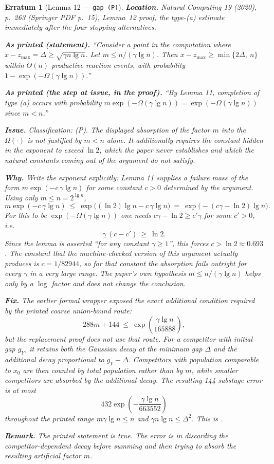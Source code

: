 \documentclass[11pt]{article}
\theoremstyle{erratumstyle}
\newtheorem{erratum}{Erratum}
\newcommand{\lgn}{\lg n}
\begin{document}
\begin{erratum}[Lemma 12 --- \texttt{gap (P)}]
\textbf{Location.} \emph{Natural Computing} 19 (2020), p.~263
(Springer PDF p.~15), Lemma~12 proof, the type-(a) estimate immediately after
the four stopping alternatives.

\medskip
\textbf{As printed (statement).}
``Consider a point in the computation where $x - z_{\max} = \Delta \ge
\sqrt{\gamma n \lgn}$. Let $m \le n/(\gamma\lgn)$. Then
$x - z_{\max} \ge \min\{2\Delta,\ n\}$ within $\Theta(n)$ productive reaction
events, with probability $1 - \exp(-\Omega(\gamma\lgn))$.''

\medskip
\textbf{As printed (the step at issue, in the proof).}
``By Lemma 11, completion of type (a) occurs with probability
$m\exp(-\Omega(\gamma\lgn)) = \exp(-\Omega(\gamma\lgn))$ since $m < n$.''

\medskip
\textbf{Issue.} Classification: (P). The displayed absorption of the factor $m$ into the
$\Omega(\cdot)$ is not justified by $m < n$ alone. It additionally requires the
constant hidden in the exponent to exceed $\ln 2$, which the paper never
establishes and which the natural constants coming out of the argument do not
satisfy.

\medskip
\textbf{Why.} Write the exponent explicitly: Lemma 11 supplies a failure mass
of the form $m\exp(-c\,\gamma\lgn)$ for some constant $c>0$ determined by the
argument. Using only $m \le n = 2^{\lgn}$,
\[
  m\exp(-c\,\gamma\lgn)\ \le\ \exp\bigl((\ln 2)\lgn - c\,\gamma\lgn\bigr)
  \ =\ \exp\bigl(-(c\gamma - \ln 2)\lgn\bigr).
\]
For this to be $\exp(-\Omega(\gamma\lgn))$ one needs $c\gamma - \ln 2 \ge
c'\gamma$ for some $c'>0$, i.e.
\[
  \gamma\,(c-c')\ \ge\ \ln 2 .
\]
Since the lemma is asserted ``for any constant $\gamma \ge 1$'', this forces
$c > \ln 2 \approx 0.693$. The constant that the machine-checked version of
this argument actually produces is $c = 1/82944$, so for that constant the
absorption fails outright for every $\gamma$ in a very large range. The
paper's own hypothesis $m \le n/(\gamma\lgn)$ helps only by a
$\log$ factor and does not change the conclusion.

\medskip
\textbf{Fix.} The earlier formal wrapper exposed the exact additional
condition required by the printed coarse union-bound route:
\[
  288m + 144\ \le\ \exp\!\left(\frac{\gamma\lgn}{165888}\right),
\]
but the replacement proof does not use that route. For a competitor with
initial gap $g_Y$, it retains both the Gaussian decay at the minimum gap
$\Delta$ and the additional decay proportional to $g_Y-\Delta$. Competitors
with population comparable to $x_0$ are then counted by total population
rather than by $m$, while smaller competitors are absorbed by the additional
decay. The resulting 144-substage error is at most
\[
  432\exp\!\left(-\frac{\gamma\lgn}{663552}\right)
\]
throughout the printed range $m\gamma\lgn\le n$ and
$\gamma n\lgn\le\Delta^2$. This is
.

\medskip
\textbf{Remark.} The printed statement is true. The error is in discarding the
competitor-dependent decay before summing and then trying to absorb the
resulting artificial factor $m$.
\end{erratum}
\end{document}
